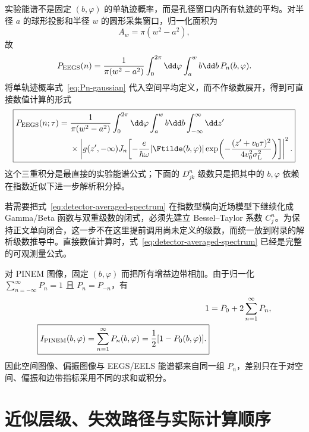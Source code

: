 实验能谱不是固定 \((b,\varphi)\) 的单轨迹概率，而是孔径窗口内所有轨迹的平均。对半径 \(a\) 的球形投影和半径 \(w\) 的圆形采集窗口，归一化面积为
\begin{equation}
A_w=\pi(w^2-a^2),
\end{equation}
故
\begin{equation}
P_{\rm EEGS}(n)
=\frac{1}{\pi(w^2-a^2)}
\int_0^{2\pi}\dd\varphi\int_a^w b\dd b\,P_n(b,\varphi).
\label{eq:EEGS_def}
\end{equation}
将单轨迹概率式~\eqref{eq:Pn-gaussian} 代入空间平均定义，而不作级数展开，得到可直接数值计算的形式
\begin{equation}
\boxed{
\begin{aligned}
P_{\rm EEGS}(n;\tau)
={}&\frac{1}{\pi(w^2-a^2)}
\int_0^{2\pi}\dd\varphi\int_a^w b\dd b
\int_{-\infty}^{\infty}\dd z'\\
&\times
\left|g(z',-\infty)
J_n\!\left[
-\frac{e}{\hbar\omega}
|\Ftilde(b,\varphi)|
\exp\!\left(-\frac{(z'+v_0\tau)^2}
{4v_0^2\sigma_{\mathrm L}^2}\right)
\right]\right|^2.
\end{aligned}}
\label{eq:detector-averaged-spectrum}
\end{equation}
这个三重积分是最直接的实验能谱公式；下面的 \(D_{jk}^n\) 级数只是把其中的 \(b,\varphi\) 依赖在指数近似下进一步解析积分掉。

若需要把式~\eqref{eq:detector-averaged-spectrum} 在指数型横向近场模型下继续化成 Gamma/Beta 函数与双重级数的闭式，必须先建立 Bessel--Taylor 系数 $C_j^n$。为保持正文单向闭合，这一步不在这里提前调用尚未定义的级数，而统一放到附录的解析级数推导中。直接数值计算时，式~\eqref{eq:detector-averaged-spectrum} 已经是完整的可观测量公式。

对 PINEM 图像，固定 \((b,\varphi)\) 而把所有增益边带相加。由于归一化
\(
\sum_{n=-\infty}^{\infty}P_n=1
\)
且 \(P_n=P_{-n}\)，有
\begin{align}
1
&=P_0+2\sum_{n=1}^{\infty}P_n,\\
\boxed{
I_{\rm PINEM}(b,\varphi)
=\sum_{n=1}^{\infty}P_n(b,\varphi)
=\frac12[1-P_0(b,\varphi)].}
\label{eq:PINEMimage}
\end{align}
因此空间图像、偏振图像与 EEGS/EELS 能谱都来自同一组 \(P_n\)，差别只在于对空间、偏振和边带指标采用不同的求和或积分。



\section{近似层级、失效路径与实际计算顺序}

